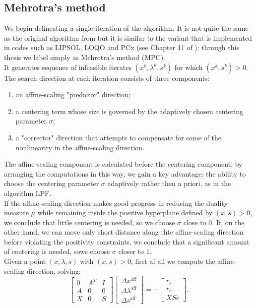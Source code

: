 \documentclass[a4paper,10 pt,titlepage,twoside]{book}
\theoremstyle{plain}
\theoremstyle{definition}
\theoremstyle{remark}
\begin{document}
\subsection{Mehrotra's method}
We begin delineating a single iteration of the algorithm. It is not quite the same as the original algorithm from \cite{MER} but it is similar to the variant that is implemented in codes such as LIPSOL, LOQO and PCx (see Chapter 11 of \cite{Wright}): through this thesis we label simply as Mehrotra's method (MPC).\\
It generates sequence of infeasible iterates $(x^{k},\lambda^{k},s^{k})$ for which $(x^{k},s^{k})>0$. The search direction at each iteration consists of three components:
\begin{enumerate}
	\item an affine-scaling "predictor" direction;
	\item a centering term whose size is governed by the adaptively chosen centering parameter $\sigma$;
	\item a "corrector" direction that attempts to compensate for some of the nonlinearity in the affine-scaling direction.
	\end{enumerate}
The affine-scaling component is calculated before the centering component; by arranging the computations in this way, we gain a key advantage: the ability to choose the centering parameter $\sigma$ adaptively rather then a priori, as in the algorithm LPF.\\
If the affine-scaling direction makes good progress in reducing the duality measure $\mu$ while remaining inside the positive hyperplane defined by $(x,s)>0$, we conclude that little centering is needed, so we choose $\sigma$ close to 0. If, on the other hand, we can move only short distance along thte affine-scaling direction before violating the positivity constraints, we conclude that a significant amount of centering is needed, sowe choose $\sigma$ closer to 1.\\
Given a point $(x, \lambda, s)$ with $(x, s)> 0$, first af all we compute the affine-scaling direction, solving:
\begin{equation}\label{(A)}\tag{4.21}
\begin{bmatrix}
0&A^{T}&I \\A&0&0\\X&0&S
\end{bmatrix}\begin{bmatrix}
\Delta x^{\text{aff}}\\\Delta\lambda^{\text{aff}}\\\Delta s^{\text{aff}}
\end{bmatrix}=-\begin{bmatrix}
r_{c}\\r_{b}\\XSe
\end{bmatrix}.
\end{equation}
\end{document}
